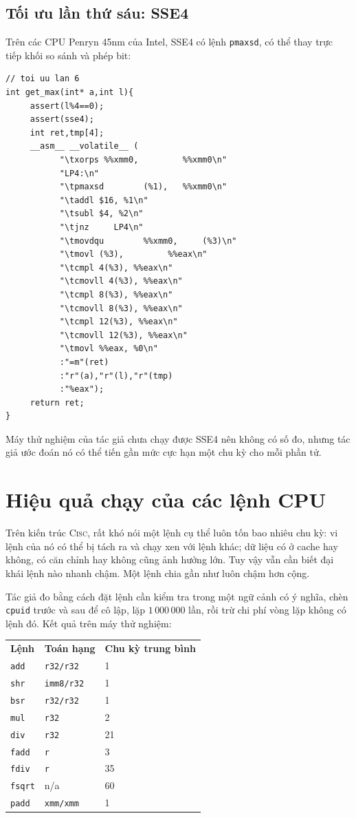 \documentclass[11pt]{article}
\newcommand{\CISC}{\textsc{Cisc}}
\begin{document}
\subsection{Tối ưu lần thứ sáu: SSE4}

Trên các CPU Penryn 45nm của Intel, SSE4 có lệnh \texttt{pmaxsd}, có thể thay
trực tiếp khối so sánh và phép bit:
\begin{verbatim}
// toi uu lan 6
int get_max(int* a,int l){
     assert(l%4==0);
     assert(sse4);
     int ret,tmp[4];
     __asm__ __volatile__ (
           "\txorps %%xmm0,         %%xmm0\n"
           "LP4:\n"
           "\tpmaxsd        (%1),   %%xmm0\n"
           "\taddl $16, %1\n"
           "\tsubl $4, %2\n"
           "\tjnz     LP4\n"
           "\tmovdqu        %%xmm0,     (%3)\n"
           "\tmovl (%3),         %%eax\n"
           "\tcmpl 4(%3), %%eax\n"
           "\tcmovll 4(%3), %%eax\n"
           "\tcmpl 8(%3), %%eax\n"
           "\tcmovll 8(%3), %%eax\n"
           "\tcmpl 12(%3), %%eax\n"
           "\tcmovll 12(%3), %%eax\n"
           "\tmovl %%eax, %0\n"
           :"=m"(ret)
           :"r"(a),"r"(l),"r"(tmp)
           :"%eax");
     return ret;
}
\end{verbatim}
Máy thử nghiệm của tác giả chưa chạy được SSE4 nên không có số đo, nhưng tác
giả ước đoán nó có thể tiến gần mức cực hạn một chu kỳ cho mỗi phần tử.

\section{Hiệu quả chạy của các lệnh CPU}

Trên kiến trúc \CISC, rất khó nói một lệnh cụ thể luôn tốn bao nhiêu chu kỳ:
vi lệnh của nó có thể bị tách ra và chạy xen với lệnh khác; dữ liệu có ở
cache hay không, có căn chỉnh hay không cũng ảnh hưởng lớn. Tuy vậy vẫn cần
biết đại khái lệnh nào nhanh chậm. Một lệnh chia gần như luôn chậm hơn cộng.

Tác giả đo bằng cách đặt lệnh cần kiểm tra trong một ngữ cảnh có ý nghĩa, chèn
\texttt{cpuid} trước và sau để cô lập, lặp \(1\,000\,000\) lần, rồi trừ chi
phí vòng lặp không có lệnh đó. Kết quả trên máy thử nghiệm:
\begin{center}
\begin{tabular}{lll}
\textbf{Lệnh} & \textbf{Toán hạng} & \textbf{Chu kỳ trung bình}\\
\texttt{add} & \texttt{r32/r32} & 1\\
\texttt{shr} & \texttt{imm8/r32} & 1\\
\texttt{bsr} & \texttt{r32/r32} & 1\\
\texttt{mul} & \texttt{r32} & 2\\
\texttt{div} & \texttt{r32} & 21\\
\texttt{fadd} & \texttt{r} & 3\\
\texttt{fdiv} & \texttt{r} & 35\\
\texttt{fsqrt} & n/a & 60\\
\texttt{padd} & \texttt{xmm/xmm} & 1
\end{tabular}
\end{center}
\end{document}
